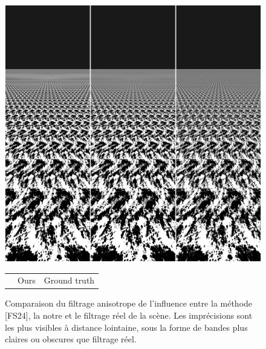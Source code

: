\documentclass{egpubl}
\begin{document}
\begin{figure}
    \includegraphics[width=\linewidth]{figures/MixMax/anisotrope.png}
    \begin{minipage}{0.85\linewidth}
        \centering
        \begin{tabular}{
            >{\centering\arraybackslash}m{}
            >{\centering\arraybackslash}m{}
            >{\centering\arraybackslash}m{}
            }
            [FS24] & Ours & Ground truth \\
        \end{tabular}
    \end{minipage}

    \caption{Comparaison du filtrage anisotrope de l'influence entre la méthode [FS24], la notre et le filtrage réel de la scène. Les imprécisions sont les plus visibles à distance lointaine, sous la forme de bandes plus claires ou obscures que filtrage réel.
    }

    \label{fig::MixMax_Priority}
\end{figure}
\end{document}
